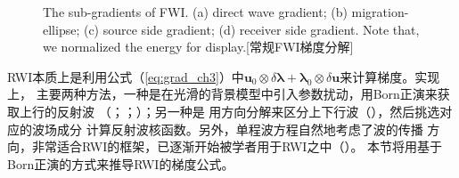 \begin{figure}[!htbp]
	\centering
	{The sub-gradients of FWI. (a) direct wave gradient; 
	(b) migration-ellipse; (c) source side gradient; (d) receiver side gradient.
	 Note that, we normalized the energy for display.}[常规FWI梯度分解]
	\label{fig:grad}
\end{figure}

RWI本质上是利用公式（\ref{eq:grad_ch3}）中$\mathbf{u}_0\otimes\delta\mathbf{\lambda}
+\mathbf{\lambda}_0\otimes\delta\mathbf{u}$来计算梯度。实现上，
主要两种方法，一种是在光滑的背景模型中引入参数扰动，用Born正演来获取上行的反射波
（；；）；另一种是
用方向分解来区分上下行波（），然后挑选对应的波场成分
计算反射波核函数。另外，单程波方程自然地考虑了波的传播
方向，非常适合RWI的框架，已逐渐开始被学者用于RWI之中（）。
本节将用基于Born正演的方式来推导RWI的梯度公式。

